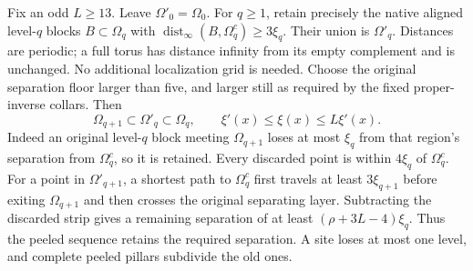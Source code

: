 \documentclass[11pt,letterpaper,reqno]{amsart}
\numberwithin{equation}{section}
\theoremstyle{definition}
\theoremstyle{remark}
\begin{document}
Fix an odd $L\ge13$. Leave $\Omega'_0=\Omega_0$.
For $q\ge1$, retain precisely the native aligned level-$q$
blocks $B\subset\Omega_q$ with
$\operatorname{dist}_\infty(B,\Omega_q^c)\ge3\xi_q$.
Their union is $\Omega'_q$. Distances are periodic; a full
torus has distance infinity from its empty complement and is
unchanged. No additional localization grid is needed.
Choose the original separation floor larger than five, and larger still as required by the fixed proper-inverse collars.
Then
\begin{equation}\label{mb:peeled-scales}
 \Omega_{q+1}\subset\Omega'_q\subset\Omega_q,
              \qquad \xi'(x)\le\xi(x)\le L\xi'(x).
\end{equation}
Indeed an original level-$q$ block meeting $\Omega_{q+1}$
loses at most $\xi_q$ from that region's separation from
$\Omega_q^c$, so it is retained. Every discarded point is
within $4\xi_q$ of $\Omega_q^c$. For a point in
$\Omega'_{q+1}$, a shortest path to $\Omega_q^c$ first
travels at least $3\xi_{q+1}$ before exiting
$\Omega_{q+1}$ and then crosses the original separating
layer. Subtracting the discarded strip gives a remaining
separation of at least $(\rho+3L-4)\xi_q$.
Thus the peeled sequence retains the required separation.
A site loses at most one level, and complete peeled pillars
subdivide the old ones.
\end{document}
